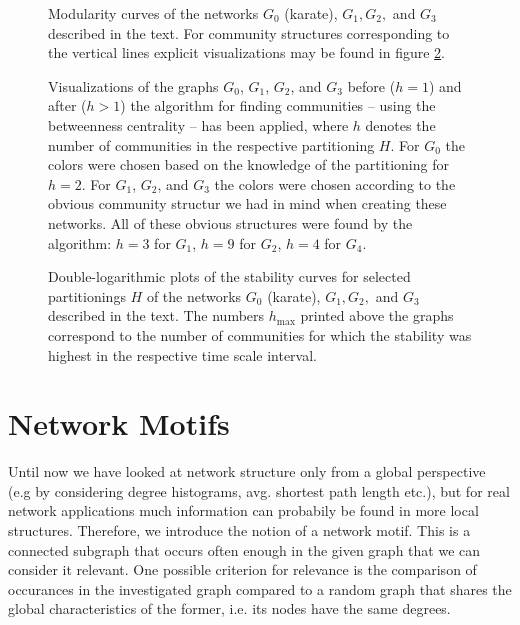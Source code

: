 \documentclass{scrartcl}
\begin{document}
\begin{figure}[bcht]
    \centering
    \caption{Modularity curves of the networks $G_0$ (karate), $G_1, G_2,$
        and $G_3$ described in the text. For community structures
        corresponding to the vertical lines explicit visualizations may be
        found in figure \ref{fig:12_gr}.}
    \label{fig:12_mod}
\end{figure}


\begin{figure}
    \centering
    \def\svgwidth{0.8\textwidth}
    
    \caption{Visualizations of the graphs $G_0$, $G_1$, $G_2$, and $G_3$
    before ($h = 1$) and after ($h > 1$) the algorithm for finding
    communities -- using the betweenness centrality -- has been applied,
    where $h$ denotes the number of communities in the respective
    partitioning $H$. For $G_0$ the colors were chosen based on the
    knowledge of the partitioning for $h=2$.  For $G_1$, $G_2$, and $G_3$
    the colors were chosen according to the obvious community
    structur we had in mind when creating these networks. All of these
    obvious structures were found by the algorithm: $h = 3$ for $G_1$,
    $h=9$ for $G_2$, $h=4$ for $G_4$.}
    \label{fig:12_gr}
\end{figure}


\begin{figure}
    \centering
    \caption{Double-logarithmic plots of the stability curves for selected
    partitionings $H$ of the networks $G_0$ (karate), $G_1, G_2,$ and
    $G_3$ described in the text. The numbers $h_\mathrm{max}$ printed above
    the graphs correspond to the number of communities for which the
    stability was highest in the respective time scale interval.}
    \label{fig:13}
\end{figure}

\section{Network Motifs}
Until now we have looked at network structure only from a global
perspective (e.g by considering degree histograms, avg. shortest path
length etc.), but for real network applications much information can
probabily be found in more local structures. Therefore, we introduce the
notion of a network motif. This is a connected subgraph that occurs often
enough in the given graph that we can consider it relevant. One possible
criterion for relevance is the comparison of occurances in the investigated
graph compared to a random graph that shares the global characteristics of
the former, i.e. its nodes have the same degrees.
\end{document}
